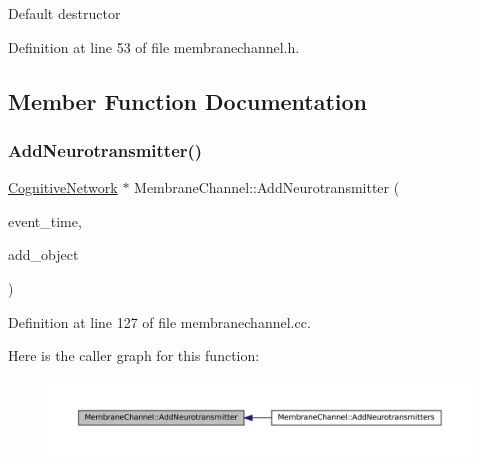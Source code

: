 Default destructor 

Definition at line 53 of file membranechannel.\+h.



\subsection{Member Function Documentation}
\mbox{\label{class_membrane_channel_ae483c6bc45f73390070b824296762d4c}} 
\subsubsection{\texorpdfstring{Add\+Neurotransmitter()}{AddNeurotransmitter()}}
{\footnotesize\ttfamily \mbox{\hyperlink{class_cognitive_network}{Cognitive\+Network}} $\ast$ Membrane\+Channel\+::\+Add\+Neurotransmitter (\begin{DoxyParamCaption}\item[{std\+::chrono\+::time\+\_\+point$<$ \mbox{\hyperlink{universe_8h_a0ef8d951d1ca5ab3cfaf7ab4c7a6fd80}{Clock}} $>$}]{event\+\_\+time,  }\item[{\mbox{\hyperlink{class_cognitive_network}{Cognitive\+Network}} $\ast$}]{add\+\_\+object }\end{DoxyParamCaption})}



Definition at line 127 of file membranechannel.\+cc.

Here is the caller graph for this function\+:\nopagebreak
\begin{figure}[H]
\begin{center}
\leavevmode
\includegraphics[width=350pt]{class_membrane_channel_ae483c6bc45f73390070b824296762d4c_icgraph}
\end{center}
\end{figure}
\mbox{\label{class_membrane_channel_a01fb5f3176cfa3423bb10a04bf69da01}} 
